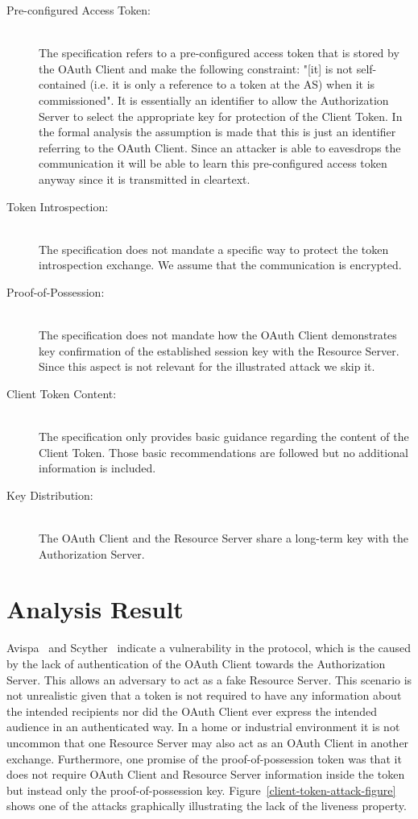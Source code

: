 \documentclass[peerreview, a4paper, 7pt]{IEEEtran}
\begin{document}
\begin{description}
	\item[Pre-configured Access Token:] \hfill \\ The specification refers to a pre-configured access token that is stored by the OAuth Client and make the following constraint: "[it] is not self-contained (i.e. it is only a reference to a token at the AS) when it is commissioned". It is essentially an identifier to allow the Authorization Server to select the appropriate key for protection of the Client Token. In the formal analysis the assumption is made that this is just an identifier referring to the OAuth Client. Since an attacker is able to eavesdrops the communication it will be able to learn this pre-configured access token anyway since it is transmitted in cleartext. \\
	\item[Token Introspection:] \hfill \\ The specification does not mandate a specific way to protect the token introspection exchange. We assume that the communication is encrypted. \\
	\item[Proof-of-Possession:] \hfill \\ The specification does not mandate how the OAuth Client demonstrates key confirmation of the established session key with the Resource Server. Since this aspect is not relevant for the illustrated attack we skip it. \\
	\item[Client Token Content:] \hfill \\ The specification only provides basic guidance regarding the content of the Client Token. Those basic recommendations are followed but no additional information is included. \\ 
	\item[Key Distribution:] \hfill \\ The OAuth Client and the Resource Server share a long-term key with the Authorization Server. 
\end{description}


\section{Analysis Result}

Avispa~\cite{Avispa} and Scyther~\cite{Scyther} indicate a vulnerability in the protocol, which is the caused by the lack of authentication of the OAuth Client towards the Authorization Server. This allows an adversary to act as a fake Resource Server. This scenario is not unrealistic given that a token is not required to have any information about the intended recipients nor did the OAuth Client ever express the intended audience in an authenticated way. In a home or industrial environment it is not uncommon that one Resource Server may also act as an OAuth Client in another exchange. Furthermore, one promise of the proof-of-possession token was that it does not require OAuth Client and Resource Server information inside the token but instead only the proof-of-possession key. Figure~\ref{client-token-attack-figure} shows one of the attacks graphically illustrating the lack of the liveness property.
\end{document}
